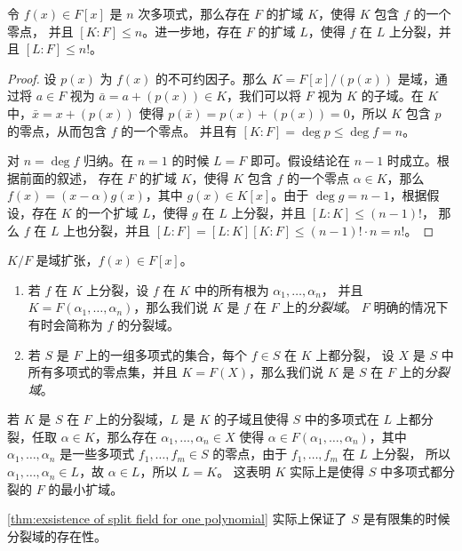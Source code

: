 \begin{theorem}\label{thm:exsistence of split field for one polynomial}
  令 $f(x)\in F[x]$ 是 $n$ 次多项式，那么存在 $F$ 的扩域 $K$，使得 $K$ 包含 $f$ 的一个零点，
  并且 $[K:F]\leq n$。进一步地，存在 $F$ 的扩域 $L$，使得 $f$ 在 $L$ 上分裂，并且
  $[L:F]\leq n!$。
\end{theorem}
\begin{proof}
  设 $p(x)$ 为 $f(x)$ 的不可约因子。那么 $K=F[x]/(p(x))$ 是域，通过将 $a\in F$
  视为 $\bar a=a+(p(x))\in K$，我们可以将 $F$ 视为 $K$ 的子域。在 $K$ 中，$\bar x=x+(p(x))$ 使得
  $p(\bar x)=p(x)+(p(x))=0$，所以 $K$ 包含 $p$ 的零点，从而包含 $f$ 的一个零点。
  并且有 $[K:F]=\deg p\leq \deg f=n$。

  对 $n=\deg f$ 归纳。在 $n=1$ 的时候 $L=F$ 即可。假设结论在 $n-1$ 时成立。根据前面的叙述，
  存在 $F$ 的扩域 $K$，使得 $K$ 包含 $f$ 的一个零点 $\alpha\in K$，那么
  $f(x)=(x-\alpha)g(x)$，其中 $g(x)\in K[x]$。由于 $\deg g=n-1$，根据假设，存在
  $K$ 的一个扩域 $L$，使得 $g$ 在 $L$ 上分裂，并且 $[L:K]\leq (n-1)!$，
  那么 $f$ 在 $L$ 上也分裂，并且 $[L:F]=[L:K][K:F]\leq (n-1)!\cdot n=n!$。
\end{proof}

\begin{definition}
  $K/F$ 是域扩张，$f(x)\in F[x]$。
  \begin{enumerate}
    \item 若 $f$ 在 $K$ 上分裂，设 $f$ 在 $K$ 中的所有根为 $\alpha_1,\dots,\alpha_n$，
    并且 $K=F(\alpha_1,\dots,\alpha_n)$，那么我们说 $K$ 是 $f$ 在 $F$ 上的\emph{分裂域}。
    $F$ 明确的情况下有时会简称为 $f$ 的分裂域。
    \item 若 $S$ 是 $F$ 上的一组多项式的集合，每个 $f\in S$ 在 $K$ 上都分裂，
    设 $X$ 是 $S$ 中所有多项式的零点集，并且 $K=F(X)$，那么我们说 $K$
    是 $S$ 在 $F$ 上的\emph{分裂域}。
  \end{enumerate}
\end{definition}

若 $K$ 是 $S$ 在 $F$ 上的分裂域，$L$ 是 $K$ 的子域且使得 $S$ 中的多项式在 $L$
上都分裂，任取 $\alpha\in K$，那么存在 $\alpha_1,\dots,\alpha_n\in X$ 使得
$\alpha\in F(\alpha_1,\dots,\alpha_n)$，其中 $\alpha_1,\dots,\alpha_n$
是一些多项式 $f_1,\dots,f_m\in S$ 的零点，由于 $f_1,\dots,f_m$ 在 $L$ 上分裂，
所以 $\alpha_1,\dots,\alpha_n\in L$，故 $\alpha\in L$，所以 $L=K$。
这表明 $K$ 实际上是使得 $S$ 中多项式都分裂的 $F$ 的最小扩域。

\autoref{thm:exsistence of split field for one polynomial} 实际上保证了
$S$ 是有限集的时候分裂域的存在性。

